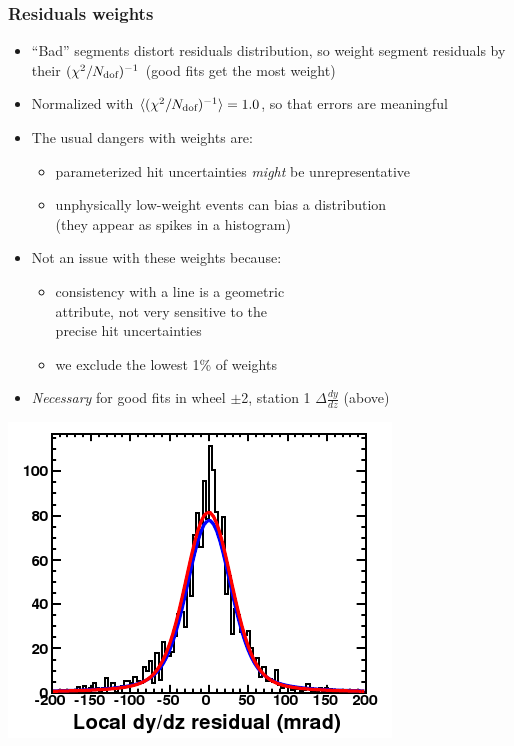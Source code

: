 \documentclass[compress]{beamer}
\begin{document}
\begin{frame}
\frametitle{Residuals weights}

\vspace{-0.5 cm}
\begin{itemize}\setlength{\itemsep}{0.25 cm}
\item ``Bad'' segments distort residuals distribution, so weight segment residuals by their $(\chi^2/N_{\mbox{\scriptsize dof}})^{-1}$ (good fits get the most weight)
\item Normalized with $\langle (\chi^2/N_{\mbox{\scriptsize dof}})^{-1} \rangle = 1.0$, so that errors are meaningful
\item The usual dangers with weights are:
\begin{itemize}\setlength{\itemsep}{0.1 cm}
\item parameterized hit uncertainties {\it might} be unrepresentative
\item unphysically low-weight events can bias a distribution \\ (they
  appear as spikes in a histogram)
\end{itemize}
\item Not an issue with these weights because:
\begin{itemize}\setlength{\itemsep}{0.1 cm}
\item consistency with a line is a geometric \\ attribute, not very sensitive to the \\ precise hit uncertainties
\item we exclude the lowest 1\% of weights
\end{itemize}
\item {\it Necessary} for good fits in wheel $\pm$2, station 1 $\Delta \frac{dy}{dz}$ (above)
\end{itemize}

\vspace{-4 cm}
\hfill \includegraphics[width=0.33\linewidth]{wheel2_station1_dydz.png}
\end{frame}
\end{document}
